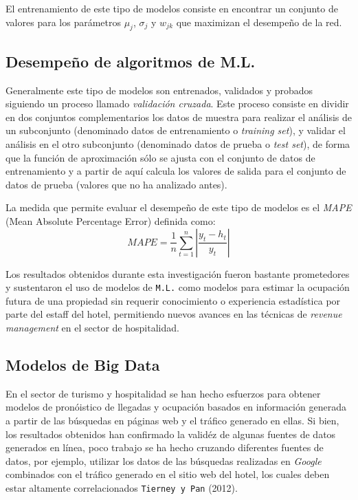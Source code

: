 {El entrenamiento de este tipo de modelos consiste en encontrar un conjunto de valores para los parámetros $\mu_j$, $\sigma_j$ y $w_{jk}$ que maximizan el desempeño de la red. 

\subsection*{Desempeño de algoritmos de M.L.}

Generalmente este tipo de modelos son entrenados, validados y probados siguiendo un proceso llamado \emph{validación cruzada}. Este proceso consiste en dividir en dos conjuntos complementarios los datos de muestra para realizar el análisis de un subconjunto (denominado datos de entrenamiento o \emph{training set}), y validar el análisis en el otro subconjunto (denominado datos de prueba o \emph{test set}), de forma que la función de aproximación sólo se ajusta con el conjunto de datos de entrenamiento y a partir de aquí calcula los valores de salida para el conjunto de datos de prueba (valores que no ha analizado antes).

La medida que permite evaluar el desempeño de este tipo de modelos es el  \emph{MAPE} (Mean Absolute Percentage Error) definida como: $$MAPE=\frac{1}{n}\sum_{t=1}^{n}|\frac{y_t-h_t}{y_t}|$$

Los resultados obtenidos durante esta investigación fueron bastante prometedores y sustentaron el uso de modelos de \texttt{M.L.} como modelos para estimar la ocupación futura de una propiedad sin requerir conocimiento o experiencia estadística por parte del estaff del hotel, permitiendo nuevos avances en las técnicas de \emph{revenue management} en el sector de hospitalidad.

\subsection*{Modelos de Big Data}

En el sector de turismo y hospitalidad se han hecho esfuerzos para obtener modelos de pronóistico de llegadas y ocupación basados en información generada a partir de las búsquedas en páginas web y el tráfico generado en ellas. Si bien, los resultados obtenidos han confirmado la validéz de algunas fuentes de datos generados en línea, poco trabajo se ha hecho cruzando diferentes fuentes de datos, por ejemplo, utilizar los datos de las búsquedas realizadas en \emph{Google} combinados con el tráfico generado en el sitio web del hotel, los cuales deben estar altamente correlacionados \texttt{Tierney y Pan} (2012).

}
